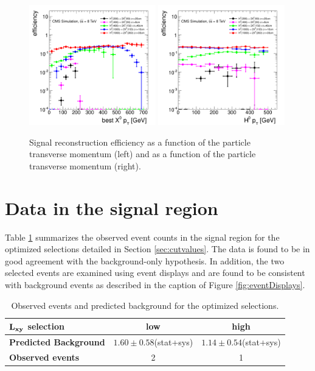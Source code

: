 \begin{figure}[htbp]
\includegraphics[width=0.49\textwidth]{plots/signal/effXPt.pdf}
\includegraphics[width=0.49\textwidth]{plots/signal/effHPt.pdf}
\caption{Signal reconstruction efficiency as a function of the \X particle transverse 
momentum (left) and as a function of the \Higgs particle transverse momentum (right).
\label{fig:effPt}}
\end{figure}


\section{Data in the signal region}
\label{sec:fullunblinding}

Table \ref{tab:fullunblinding} summarizes the observed event counts in the signal region for the optimized 
selections detailed in Section \ref{sec:cutvalues}. The data is found to be in good agreement with the 
background-only hypothesis. In addition, the two selected events are examined using event displays
and are found to be consistent with background events as described in the caption of 
Figure \ref{fig:eventDisplays}.  

\begin{table}[htbp]
\centering
\begin{tabular}{|l|c|c|}
\hline
$\bf L_{xy}$ \bf selection & \bf low & \bf high \\
\hline
\bf Predicted Background & $ 1.60\pm0.58$(stat+sys) & $ 1.14\pm0.54$(stat+sys) \\
\hline
\bf Observed events & 2 & 1 \\ 
\hline
\end{tabular}
\caption{Observed events and predicted background for the optimized selections.\label{tab:fullunblinding}}
\end{table}

